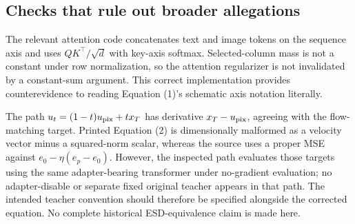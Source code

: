 \documentclass[10pt]{article}
\begin{document}
\subsection*{Checks that rule out broader allegations}
The relevant attention code concatenates text and image tokens on the sequence axis and uses \(QK^\top/\sqrt d\) with key-axis softmax. Selected-column mass is not a constant under row normalization, so the attention regularizer is not invalidated by a constant-sum argument. This correct implementation provides counterevidence to reading Equation (1)’s schematic axis notation literally.\par
The path \(u_t=(1-t)u_{\rm pix}+tx_T\) has derivative \(x_T-u_{\rm pix}\), agreeing with the flow-matching target. Printed Equation (2) is dimensionally malformed as a velocity vector minus a squared-norm scalar, whereas the source uses a proper MSE against \(e_0-\eta(e_p-e_0)\). However, the inspected path evaluates those targets using the same adapter-bearing transformer under no-gradient evaluation; no adapter-disable or separate fixed original teacher appears in that path. The intended teacher convention should therefore be specified alongside the corrected equation. No complete historical ESD-equivalence claim is made here.\par
\end{document}
